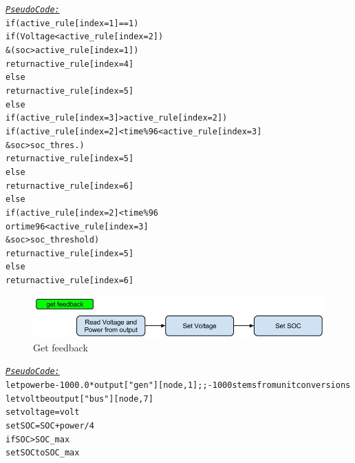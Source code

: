 \documentclass[a4paper]{article}
\begin{document}
\begin{alltt}
 \underline{\textit{Pseudo Code:}}
if (active_rule[index = 1] ==1)
    if (Voltage < active_rule[index = 2]) 
	& (soc > active_rule[index = 1])
        return active_rule[index = 4]
    else 
        return active_rule[index = 5]
else 
    if (active_rule[index = 3] > active_rule[index=2])
        if (active_rule[index = 2] < time\%96 < active_rule[index = 3]
	    &  soc > soc_thres.)
            return active_rule[index = 5]
        else 
            return active_rule[index = 6]
    else 
        if  (active_rule[index = 2] < time\%96  
	      or time  96 < active_rule[index = 3]
	      &  soc > soc_threshold)
            return active_rule[index = 5]
        else 
            return active_rule[index = 6]
\end{alltt}

\begin{figure}[!ht]
\includegraphics[width =\textwidth]{get_feedback.jpg}
\caption{Get feedback}
\label{get_feedback}
\end{figure}
\begin{alltt}
 \underline{\textit{Pseudo Code:}}
let power be  - 1000.0 * output["gen"][node,1] ;; -1000 stems from unit conversions
let volt be output["bus"][node,7]
set voltage = volt
set SOC = SOC + power/4
if SOC > SOC_max 
    set SOC to SOC_max
\end{alltt}
\newpage
\end{document}
